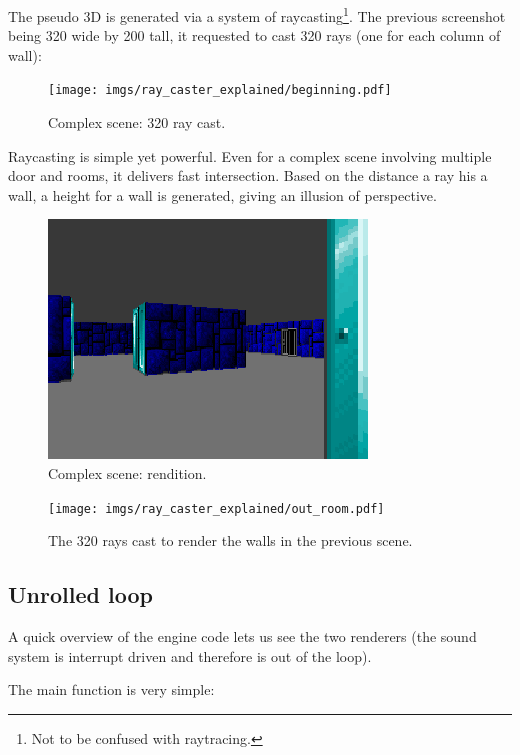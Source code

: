 \documentclass[book.tex]{subfiles}
\begin{document}
 The pseudo 3D is generated via a system of raycasting\footnote{Not to be confused with raytracing.}. The previous screenshot being 320 wide by 200 tall, it requested to cast 320 rays (one for each column of wall):

\begin{figure}[H]
  \centering
  \texttt{[image: imgs/ray\_caster\_explained/beginning.pdf]}
 \caption{Complex scene: 320 ray cast.} 
\end{figure}

Raycasting is simple yet powerful. Even for a complex scene involving multiple door and rooms, it delivers fast intersection. Based on the distance a ray his a wall, a height for a wall is generated, giving an illusion of perspective.
\begin{figure}[H]
  \centering
 \includegraphics[width=\textwidth]{imgs/ray_caster_explained/out_door.png}
 \caption{Complex scene: rendition.} 
\end{figure}
\par
\begin{figure}[H]
\centering
 \texttt{[image: imgs/ray\_caster\_explained/out\_room.pdf]}
 \caption{The 320 rays cast to render the walls in the previous scene.} \label{fig:Raycasting2}
\end{figure}


\subsection{Unrolled loop}
A quick overview of the engine code lets us see the two renderers (the sound system is interrupt driven and therefore is out of the loop).\\
\par
The main function is very simple:\\
\par
\begin{minipage}{\textwidth}

\end{minipage}
\par
\end{document}
